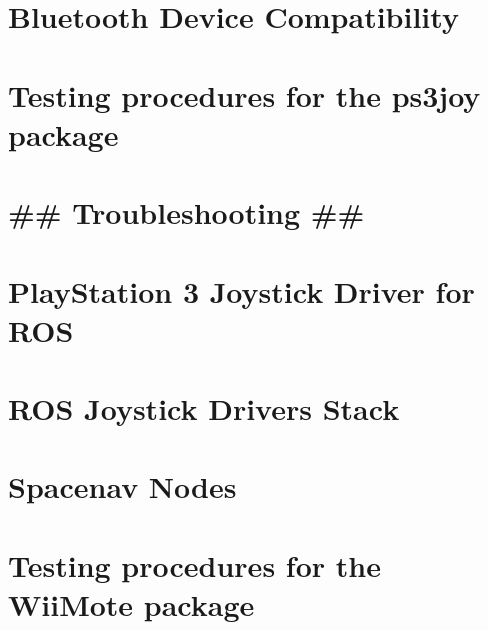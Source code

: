 \let\mypdfximage\pdfximage\def\pdfximage{\immediate\mypdfximage}\documentclass[twoside]{book}
\newcommand{\+}{\discretionary{\mbox{\scriptsize$\hookleftarrow$}}{}{}}
\begin{document}
\chapter{Bluetooth Device Compatibility}
\label{md_catkin_ws_src_utilities_joystick_drivers_ps3joy_doc_bluetooth_devices}

\chapter{Testing procedures for the ps3joy package}
\label{md_catkin_ws_src_utilities_joystick_drivers_ps3joy_doc_testing}

\chapter{\#\# Troubleshooting \#\#}
\label{md_catkin_ws_src_utilities_joystick_drivers_ps3joy_doc_troubleshooting}

\chapter{Play\+Station 3 Joystick Driver for R\+OS}
\label{md_catkin_ws_src_utilities_joystick_drivers_ps3joy_README}

\chapter{R\+OS Joystick Drivers Stack}
\label{md_catkin_ws_src_utilities_joystick_drivers_README}

\chapter{Spacenav Nodes}
\label{md_catkin_ws_src_utilities_joystick_drivers_spacenav_node_README}

\chapter{Testing procedures for the Wii\+Mote package}
\label{md_catkin_ws_src_utilities_joystick_drivers_wiimote_doc_testing}

\end{document}
